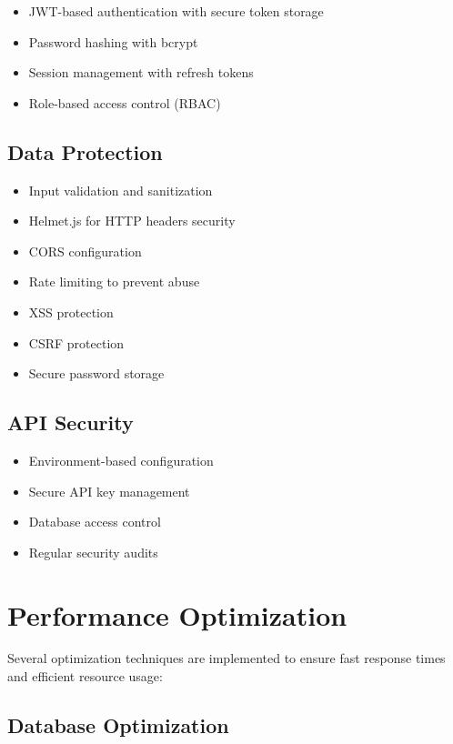 \begin{itemize}
    \item JWT-based authentication with secure token storage
    \item Password hashing with bcrypt
    \item Session management with refresh tokens
    \item Role-based access control (RBAC)
\end{itemize}

\subsection{Data Protection}

\begin{itemize}
    \item Input validation and sanitization
    \item Helmet.js for HTTP headers security
    \item CORS configuration
    \item Rate limiting to prevent abuse
    \item XSS protection
    \item CSRF protection
    \item Secure password storage
\end{itemize}

\subsection{API Security}

\begin{itemize}
    \item Environment-based configuration
    \item Secure API key management
    \item Database access control
    \item Regular security audits
\end{itemize}

\section{Performance Optimization}

Several optimization techniques are implemented to ensure fast response times and efficient resource usage:

\subsection{Database Optimization}

